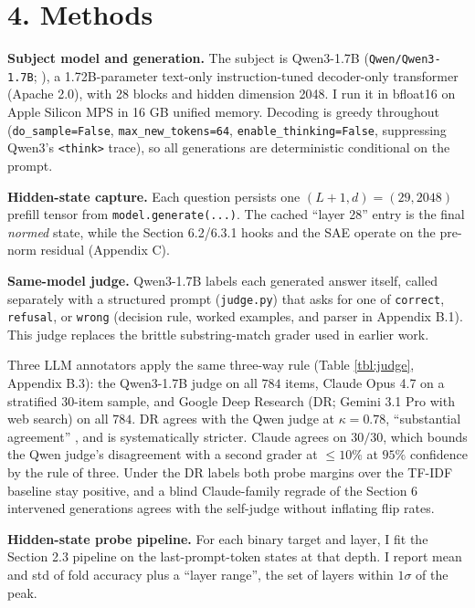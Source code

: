 \section{4. Methods}\label{methods}

\textbf{Subject model and generation.} The subject is Qwen3-1.7B
(\texttt{Qwen/Qwen3-1.7B}; \citealp{qwen2025qwen3}), a 1.72B-parameter
text-only instruction-tuned decoder-only transformer (Apache 2.0), with
28 blocks and hidden dimension 2048. I run it in bfloat16 on Apple
Silicon MPS in 16 GB unified memory. Decoding is greedy throughout
(\texttt{do\_sample=False}, \texttt{max\_new\_tokens=64},
\texttt{enable\_thinking=False}, suppressing Qwen3's
\texttt{\textless{}think\textgreater{}} trace), so all generations are
deterministic conditional on the prompt.

\textbf{Hidden-state capture.} Each question persists one \((L+1, d) =
(29, 2048)\) prefill tensor from \texttt{model.generate(...)}. The cached
``layer 28'' entry is the final \emph{normed} state, while the Section
6.2/6.3.1 hooks and the SAE operate on the pre-norm residual (Appendix C).

\textbf{Same-model judge.} Qwen3-1.7B labels each generated answer
itself, called separately with a structured prompt (\texttt{judge.py})
that asks for one of \texttt{correct}, \texttt{refusal}, or
\texttt{wrong} (decision rule, worked examples, and parser in Appendix
B.1). This judge replaces the brittle substring-match grader used in
earlier work.

Three LLM annotators apply the same three-way rule (Table \ref{tbl:judge},
Appendix B.3): the Qwen3-1.7B judge on all \(784\) items, Claude Opus 4.7
on a stratified \(30\)-item sample, and Google Deep Research (DR; Gemini
3.1 Pro with web search) on all \(784\). DR agrees with the Qwen judge at
\(\kappa = 0.78\), ``substantial agreement'' \citep{landis1977agreement},
and is systematically stricter. Claude agrees on \(30/30\), which bounds
the Qwen judge's disagreement with a second grader at \(\le 10\%\) at
\(95\%\) confidence by the rule of three. Under the DR labels both probe
margins over the TF-IDF baseline stay positive, and a blind Claude-family
regrade of the Section 6 intervened generations agrees with the self-judge
without inflating flip rates.

\textbf{Hidden-state probe pipeline.} For each binary target and layer,
I fit the Section 2.3 pipeline on the last-prompt-token states at that
depth. I report mean and std of fold accuracy plus a ``layer range'',
the set of layers within \(1\sigma\) of the peak.

